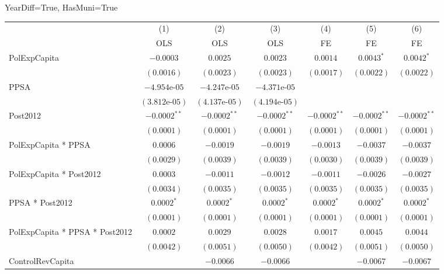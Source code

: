\documentclass[border=10pt,varwidth=25cm]{standalone}
\renewenvironment{table}[1][]{}{}
\begin{document}
\begin{table}[H]
    \centering
    \scriptsize
    \begin{minipage}{\textwidth}
    \centering
    {\normalsize YearDiff=True, HasMuni=True}
    \vspace{6pt}
    \begin{tabular}{lcccccc}
        \toprule
         & (1) & (2) & (3) & (4) & (5) & (6) \\
         & OLS & OLS & OLS & FE & FE & FE \\
        \midrule
        PolExpCapita & $-0.0003$ & $0.0025$ & $0.0023$ & $0.0014$ & $0.0043^{*}$ & $0.0042^{*}$ \\
         & $(0.0016)$ & $(0.0023)$ & $(0.0023)$ & $(0.0017)$ & $(0.0022)$ & $(0.0022)$ \\[4pt]
        PPSA & $-4.954\text{e-}05$ & $-4.247\text{e-}05$ & $-4.371\text{e-}05$ &  &  &  \\
         & $(3.812\text{e-}05)$ & $(4.137\text{e-}05)$ & $(4.194\text{e-}05)$ &  &  &  \\[4pt]
        Post2012 & $-0.0002^{**}$ & $-0.0002^{**}$ & $-0.0002^{**}$ & $-0.0002^{**}$ & $-0.0002^{**}$ & $-0.0002^{**}$ \\
         & $(0.0001)$ & $(0.0001)$ & $(0.0001)$ & $(0.0001)$ & $(0.0001)$ & $(0.0001)$ \\[4pt]
        PolExpCapita * PPSA & $0.0006$ & $-0.0019$ & $-0.0019$ & $-0.0013$ & $-0.0037$ & $-0.0037$ \\
         & $(0.0029)$ & $(0.0039)$ & $(0.0039)$ & $(0.0030)$ & $(0.0039)$ & $(0.0039)$ \\[4pt]
        PolExpCapita * Post2012 & $0.0003$ & $-0.0011$ & $-0.0012$ & $-0.0011$ & $-0.0026$ & $-0.0027$ \\
         & $(0.0034)$ & $(0.0035)$ & $(0.0035)$ & $(0.0035)$ & $(0.0035)$ & $(0.0035)$ \\[4pt]
        PPSA * Post2012 & $0.0002^{*}$ & $0.0002^{*}$ & $0.0002^{*}$ & $0.0002^{*}$ & $0.0002^{*}$ & $0.0002^{*}$ \\
         & $(0.0001)$ & $(0.0001)$ & $(0.0001)$ & $(0.0001)$ & $(0.0001)$ & $(0.0001)$ \\[4pt]
        PolExpCapita * PPSA * Post2012 & $0.0002$ & $0.0029$ & $0.0028$ & $0.0017$ & $0.0045$ & $0.0044$ \\
         & $(0.0042)$ & $(0.0051)$ & $(0.0050)$ & $(0.0042)$ & $(0.0051)$ & $(0.0050)$ \\[4pt]
        ControlRevCapita &  & $-0.0066$ & $-0.0066$ &  & $-0.0067$ & $-0.0067$ \\

\end{tabular}
\end{minipage}
\end{table}
\end{document}
